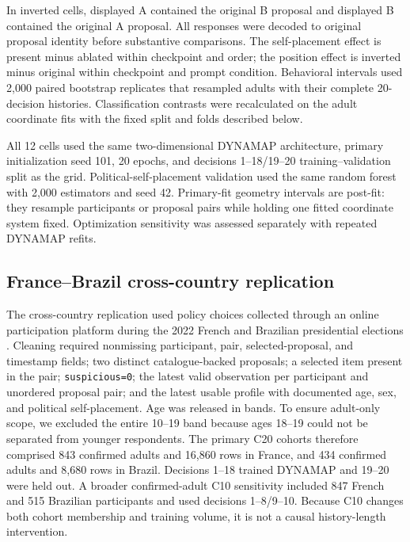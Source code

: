 \documentclass[unnumsec,webpdf,modern,large]{oup-authoring-template}
\begin{document}
In inverted cells, displayed A contained the original B proposal and displayed B contained the original A proposal. All responses were decoded to original proposal identity before substantive comparisons. The self-placement effect is present minus ablated within checkpoint and order; the position effect is inverted minus original within checkpoint and prompt condition. Behavioral intervals used 2,000 paired bootstrap replicates that resampled adults with their complete 20-decision histories. Classification contrasts were recalculated on the adult coordinate fits with the fixed split and folds described below.

All 12 cells used the same two-dimensional DYNAMAP architecture, primary initialization seed 101, 20 epochs, and decisions 1--18/19--20 training--validation split as the grid. Political-self-placement validation used the same random forest with 2,000 estimators and seed 42. Primary-fit geometry intervals are post-fit: they resample participants or proposal pairs while holding one fitted coordinate system fixed. Optimization sensitivity was assessed separately with repeated DYNAMAP refits.

\subsection{France--Brazil cross-country replication}

The cross-country replication used policy choices collected through an online participation platform during the 2022 French and Brazilian presidential elections \citep{Navarrete2023Data,Navarrete2024}. Cleaning required nonmissing participant, pair, selected-proposal, and timestamp fields; two distinct catalogue-backed proposals; a selected item present in the pair; \texttt{suspicious=0}; the latest valid observation per participant and unordered proposal pair; and the latest usable profile with documented age, sex, and political self-placement. Age was released in bands. To ensure adult-only scope, we excluded the entire 10--19 band because ages 18--19 could not be separated from younger respondents. The primary C20 cohorts therefore comprised 843 confirmed adults and 16,860 rows in France, and 434 confirmed adults and 8,680 rows in Brazil. Decisions 1--18 trained DYNAMAP and 19--20 were held out. A broader confirmed-adult C10 sensitivity included 847 French and 515 Brazilian participants and used decisions 1--8/9--10. Because C10 changes both cohort membership and training volume, it is not a causal history-length intervention.
\end{document}
